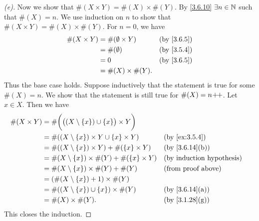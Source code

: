 \begin{proof}[(e)]
	Now we show that \(\#(X \times Y) = \#(X) \times \#(Y)\).
	By \cref{3.6.10} \(\exists n \in \mathbb{N}\) such that \(\#(X) = n\).
	We use induction on \(n\) to show that \(\#(X \times Y) = \#(X) \times \#(Y)\).
	For \(n = 0\), we have
	\begin{align*}
		\#(X \times Y) & = \#(\emptyset \times Y) &  & \by{3.6.5} \\
		               & = \#(\emptyset)          &  & \by{3.5.4} \\
		               & = 0                      &  & \by{3.6.5} \\
		               & = \#(X) \times \#(Y).
	\end{align*}
	Thus the base case holds.
	Suppose inductively that the statement is true for some \(\#(X) = n\).
	We show that the statement is still true for \(\#(X) = n\!+\!\!+\).
	Let \(x \in X\).
	Then we have
	\begin{align*}
		\#(X \times Y) & = \#\bigg(\big((X \setminus \set{x}) \cup \set{x}\big) \times Y\bigg)                                   \\
		               & = \#((X \setminus \set{x}) \times Y \cup \set{x} \times Y)            &  & \by{ex:3.5.4}                \\
		               & = \#((X \setminus \set{x}) \times Y) + \#(\set{x} \times Y)           &  & \text{(by \cref{3.6.14}(b))} \\
		               & = \#(X \setminus \set{x}) \times \#(Y) + \#(\set{x} \times Y)         &  & \byIH                        \\
		               & = \#(X \setminus \set{x}) \times \#(Y) + \#(Y)                        &  & \text{(from proof above)}    \\
		               & = (\#(X \setminus \set{x}) + 1) \times \#(Y)                                                            \\
		               & = \#((X \setminus \set{x}) \cup \set{x}) \times \#(Y)                 &  & \text{(by \cref{3.6.14}(a))} \\
		               & = \#(X) \times \#(Y).                                                 &  & \text{(by \cref{3.1.28}(g))}
	\end{align*}
	This closes the induction.
\end{proof}

